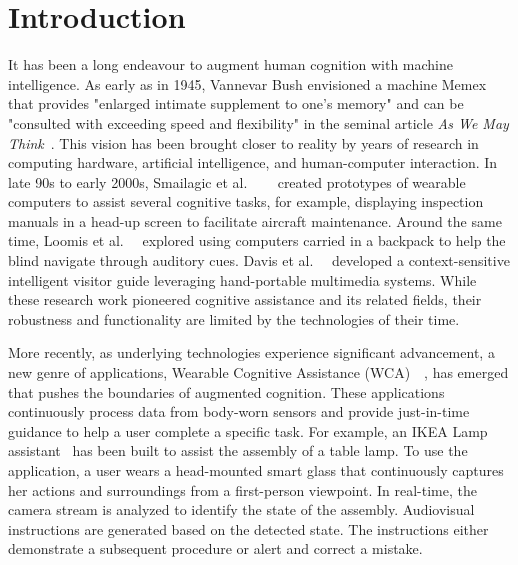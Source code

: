\chapter{Introduction}
\label{chapter: intro}

It has been a long endeavour to augment human cognition with machine
intelligence. As early as in 1945, Vannevar Bush envisioned a machine Memex that
provides "enlarged intimate supplement to one's memory" and can be "consulted
with exceeding speed and flexibility" in the seminal article \textit{As We May
Think}~\cite{bush1945we}. This vision has been brought closer to reality by
years of research in computing hardware, artificial intelligence, and
human-computer interaction. In late 90s to early 2000s, Smailagic et al.
~\cite{smailagic1993case}~\cite{smailagic1998very}~\cite{smailagic2002application}
created prototypes of wearable computers to assist several cognitive tasks, for
example, displaying inspection manuals in a head-up screen to facilitate
aircraft maintenance. Around the same time, Loomis et
al.~\cite{loomis1998navigation}~\cite{loomis1994personal} explored using
computers carried in a backpack to help the blind navigate through auditory
cues. Davis et al.~\cite{davies1998developing}~\cite{cheverst2000developing}
developed a context-sensitive intelligent visitor guide leveraging hand-portable
multimedia systems. While these research work pioneered cognitive assistance and
its related fields, their robustness and functionality are limited by the
technologies of their time.

More recently, as underlying technologies experience significant advancement, a
new genre of applications, Wearable Cognitive Assistance
(WCA)~\cite{ha2014towards}~\cite{chen2018application}, has emerged that pushes
the boundaries of augmented cognition. These applications continuously process
data from body-worn sensors and provide just-in-time guidance to help a user
complete a specific task. For example, an IKEA Lamp
assistant~\cite{chen2018application} has been built to assist the assembly of a
table lamp. To use the application, a user wears a head-mounted smart glass that
continuously captures her actions and surroundings from a first-person
viewpoint. In real-time, the camera stream is analyzed to identify the state of
the assembly. Audiovisual instructions are generated based on the detected
state. The instructions either demonstrate a subsequent procedure or alert and
correct a mistake.

